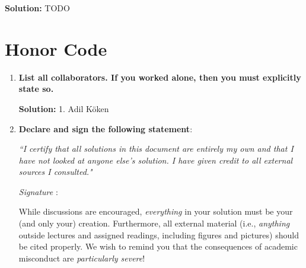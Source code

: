 \documentclass{article}
\newcommand{\Question}[1]{\Large \section{ #1 } \normalsize}
\newenvironment{solution}{\color{blue} \smallskip \textbf{Solution:}}{}
\begin{document}
\begin{solution}
    TODO
\end{solution}

\newpage
\Question{Honor Code}

\begin{enumerate}
    \item 
    \textbf{List all collaborators. If you worked alone, then you must explicitly state so.}

    \begin{solution}
        1. Adil Köken
    \end{solution}

    \item
    \textbf{Declare and sign the following statement}: 
    
    \textit{``I certify that all solutions in this document are entirely my own and that I have not looked at anyone else's solution. I have given credit to all external sources I consulted."}
    
    \textit{Signature} : \hrulefill
    
    While discussions are encouraged, \emph{everything} in your solution must be your (and only your) creation. 
    Furthermore, all external material  (i.e., \emph{anything} outside lectures and assigned
    readings, including figures and pictures) should be cited properly.
    We wish to remind you that the consequences of academic misconduct are \emph{particularly severe}!


\end{enumerate}
\end{document}
